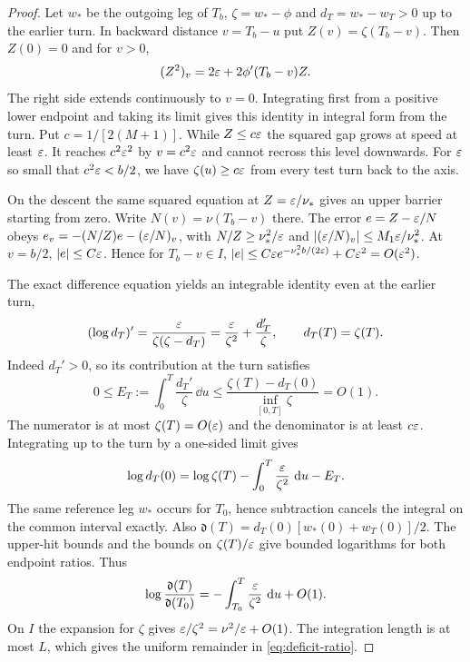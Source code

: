 \begin{proof}
Let $w_*$ be the outgoing leg of $T_b$, $\zeta=w_*-\phi$ and
$d_T=w_*-w_T>0$ up to the earlier turn. In backward distance
$v=T_b-u$ put $Z(v)=\zeta(T_b-v)$. Then $Z(0)=0$ and for $v>0$,
\[
 (Z^2)_v=2\varepsilon+2\phi'(T_b-v)Z .
\]
The right side extends continuously to $v=0$. Integrating first from
a positive lower endpoint and taking its limit gives this identity
in integral form from the turn. Put $c=1/[2(M+1)]$. While $Z\le c\varepsilon$
the squared gap grows at speed at least $\varepsilon$. It reaches $c^2\varepsilon^2$
by $v=c^2\varepsilon$ and cannot recross this level downwards. For $\varepsilon$ so
small that $c^2\varepsilon<b/2$, we have $\zeta(u)\ge c\varepsilon$ from every
test turn back to the axis.

On the descent the same squared equation at $Z=\varepsilon/\nu_*$ gives an
upper barrier starting from zero. Write $N(v)=\nu(T_b-v)$ there.
The error $e=Z-\varepsilon/N$ obeys $e_v=-(N/Z)e-(\varepsilon/N)_v$, with
$N/Z\ge\nu_*^2/\varepsilon$ and $|(\varepsilon/N)_v|\le M_1\varepsilon/\nu_*^2$.
At $v=b/2$, $|e|\le C\varepsilon$. Hence for $T_b-v\in I$,
$|e|\le C\varepsilon e^{-\nu_*^2 b/(2\varepsilon)}+C\varepsilon^2=O(\varepsilon^2)$.

The exact difference equation yields an integrable identity even at
the earlier turn,
\[
 (\log d_T)'=\frac{\varepsilon}{\zeta(\zeta-d_T)}
             =\frac{\varepsilon}{\zeta^2}+\frac{d_T'}{\zeta},\qquad d_T(T)=\zeta(T).
\]
Indeed $d_T'>0$, so its contribution at the turn satisfies
\[
 0\le E_T:=\int_0^T\frac{d_T'}\zeta\,\dd u
 \le\frac{\zeta(T)-d_T(0)}{\inf_{[0,T]}\zeta}=O(1).
\]
The numerator is at most $\zeta(T)=O(\varepsilon)$ and the denominator is at
least $c\varepsilon$. Integrating up to the turn by a one-sided limit gives
\[
 \log d_T(0)=\log \zeta(T)-\int_0^T\frac{\varepsilon}{\zeta^2}\,\,\mathrm{d} u-E_T .
\]
The same reference leg $w_*$ occurs for $T_0$, hence subtraction
cancels the integral on the common interval exactly. Also
$\mathfrak d(T)=d_T(0)[w_*(0)+w_T(0)]/2$. The upper-hit bounds and the bounds
on $\zeta(T)/\varepsilon$ give bounded logarithms for both endpoint ratios. Thus
\[
 \log\frac{\mathfrak d(T)}{\mathfrak d(T_0)}
 =-\int_{T_0}^T\frac{\varepsilon}{\zeta^2}\,\,\mathrm{d} u+O(1).
\]
On $I$ the expansion for $\zeta$ gives
$\varepsilon/\zeta^2=\nu^2/\varepsilon+O(1)$. The integration length is at most
$L$, which gives the uniform remainder in \eqref{eq:deficit-ratio}.
\end{proof}
